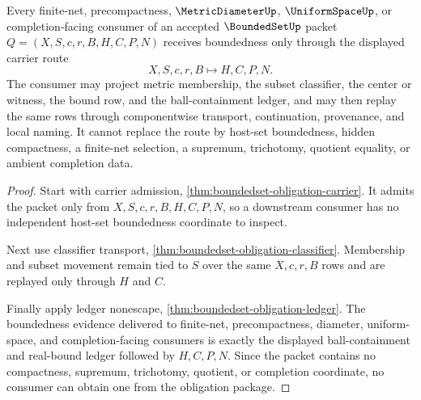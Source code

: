 \begin{theorem}
\label{thm:bounded-set-obligation-consumer-package}
Every finite-net, precompactness, $\MetricDiameterUp$, $\UniformSpaceUp$, or completion-facing consumer of an accepted $\BoundedSetUp$ packet $Q=(X,S,c,r,B,H,C,P,N)$ receives boundedness only through the displayed carrier route
$$
X,S,c,r,B \longmapsto H,C,P,N .
$$
The consumer may project metric membership, the subset classifier, the center or witness, the bound row, and the ball-containment ledger, and may then replay the same rows through componentwise transport, continuation, provenance, and local naming. It cannot replace the route by host-set boundedness, hidden compactness, a finite-net selection, a supremum, trichotomy, quotient equality, or ambient completion data.
\end{theorem}
\begin{proof}
Start with carrier admission, \autoref{thm:boundedset-obligation-carrier}. It admits the packet only from $X,S,c,r,B,H,C,P,N$, so a downstream consumer has no independent host-set boundedness coordinate to inspect.

Next use classifier transport, \autoref{thm:boundedset-obligation-classifier}. Membership and subset movement remain tied to $S$ over the same $X,c,r,B$ rows and are replayed only through $H$ and $C$.

Finally apply ledger nonescape, \autoref{thm:boundedset-obligation-ledger}. The boundedness evidence delivered to finite-net, precompactness, diameter, uniform-space, and completion-facing consumers is exactly the displayed ball-containment and real-bound ledger followed by $H,C,P,N$. Since the packet contains no compactness, supremum, trichotomy, quotient, or completion coordinate, no consumer can obtain one from the obligation package.
\end{proof}

